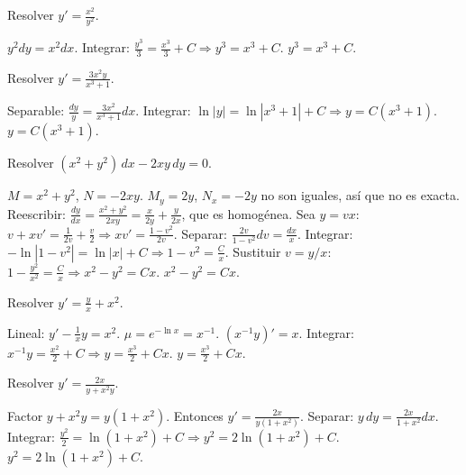 \begin{prob}
Resolver \(y' = \frac{x^2}{y^2}\).
\begin{myproof}
\(y^2 dy = x^2 dx\). Integrar: \(\frac{y^3}{3} = \frac{x^3}{3} + C \Rightarrow y^3 = x^3 + C\). \(\boxed{y^3 = x^3 + C}\).
\end{myproof}
\end{prob}

\begin{prob}
Resolver \(y' = \frac{3x^2 y}{x^3+1}\).
\begin{myproof}
Separable: \(\frac{dy}{y} = \frac{3x^2}{x^3+1}dx\). Integrar: \(\ln|y| = \ln|x^3+1| + C \Rightarrow y = C(x^3+1)\). \(\boxed{y = C(x^3+1)}\).
\end{myproof}
\end{prob}

\begin{prob}
Resolver \((x^2+y^2)\,dx - 2xy\,dy = 0\).
\begin{myproof}
\(M=x^2+y^2\), \(N=-2xy\). \(M_y=2y\), \(N_x=-2y\) no son iguales, así que no es exacta. Reescribir: \(\frac{dy}{dx} = \frac{x^2+y^2}{2xy} = \frac{x}{2y}+\frac{y}{2x}\), que es homogénea. Sea \(y=vx\): \(v+xv' = \frac{1}{2v}+\frac{v}{2} \Rightarrow xv' = \frac{1-v^2}{2v}\). Separar: \(\frac{2v}{1-v^2}dv = \frac{dx}{x}\). Integrar: \(-\ln|1-v^2| = \ln|x|+C \Rightarrow 1-v^2 = \frac{C}{x}\). Sustituir \(v=y/x\): \(1 - \frac{y^2}{x^2} = \frac{C}{x} \Rightarrow x^2 - y^2 = Cx\). \(\boxed{x^2 - y^2 = Cx}\).
\end{myproof}
\end{prob}

\begin{prob}
Resolver \(y' = \frac{y}{x} + x^2\).
\begin{myproof}
Lineal: \(y' - \frac{1}{x}y = x^2\). \(\mu = e^{-\ln x}=x^{-1}\). \((x^{-1}y)'=x\). Integrar: \(x^{-1}y = \frac{x^2}{2}+C \Rightarrow y = \frac{x^3}{2}+Cx\). \(\boxed{y = \frac{x^3}{2}+Cx}\).
\end{myproof}
\end{prob}

\begin{prob}
Resolver \(y' = \frac{2x}{y+x^2 y}\).
\begin{myproof}
Factor \(y+x^2 y = y(1+x^2)\). Entonces \(y' = \frac{2x}{y(1+x^2)}\). Separar: \(y\,dy = \frac{2x}{1+x^2}dx\). Integrar: \(\frac{y^2}{2} = \ln(1+x^2)+C \Rightarrow y^2 = 2\ln(1+x^2)+C\). \(\boxed{y^2 = 2\ln(1+x^2)+C}\).
\end{myproof}
\end{prob}

